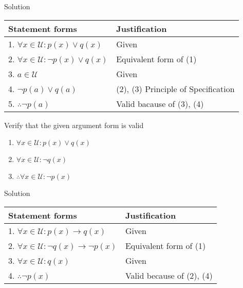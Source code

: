 Solution
\begin{table}[hbt!]
    \centering
    \begin{tabular}{|l | l|} 
    \hline
    Statement forms & Justification\\ [0.5ex] 
    \hline
        1. $\forall x \in \mathcal U: p(x) \lor q(x)$ & Given \\
        2. $\forall x \in \mathcal U: \neg p(x) \lor q(x)$ & Equivalent form of (1) \\
        3. $a \in \mathcal U$ & Given \\
        4. $\neg p(a) \lor q(a)$ & (2), (3) Principle of Specification \\
        5. $\therefore \neg p(a)$ & Valid bacause of (3), (4) \\
    \hline
    \end{tabular}
\end{table}

\begin{longfbox}
    \begin{bt} \label{pro:practice2.31}
        Verify that the given argument form is valid
        \begin{enumerate}
            \item[] $\forall x \in \mathcal U: p(x) \lor q(x)$
            \item[] $\forall x \in \mathcal U: \neg q(x)$
            \item[] $\therefore \forall x \in \mathcal U: \neg p(x)$
        \end{enumerate}
    \end{bt}
\end{longfbox}

Solution
\begin{table}[hbt!]
    \centering
    \begin{tabular}{|l | l|} 
    \hline
    Statement forms & Justification\\ [0.5ex] 
    \hline
        1. $\forall x \in \mathcal U: p(x) \rightarrow q(x)$ & Given \\
        2. $\forall x \in \mathcal U: \neg q(x) \rightarrow \neg p(x)$ & Equivalent form of (1) \\
        3. $\forall x \in \mathcal U: q(x)$ & Given \\
        4. $\therefore \neg p(x)$ & Valid because of (2), (4) \\
    \hline
    \end{tabular}
\end{table}

